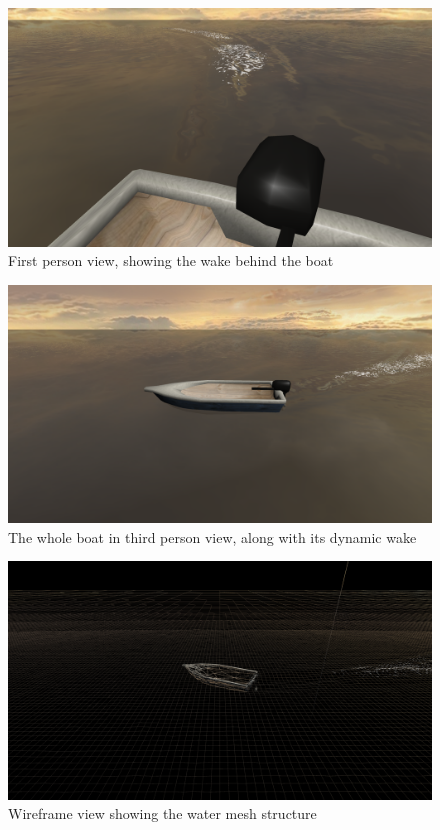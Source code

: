 \documentclass[a4paper,11pt]{article}
\begin{document}
\begin{figure}[h!]
\centering
\includegraphics[width=\textwidth]{screen4.png}
\caption{First person view, showing the wake behind the boat}
\end{figure}

\begin{figure}[h!]
\centering
\includegraphics[width=\textwidth]{screen2.png}
\caption{The whole boat in third person view, along with its dynamic wake}
\end{figure}

\begin{figure}[h!]
\centering
\includegraphics[width=\textwidth]{screen3.png}
\caption{Wireframe view showing the water mesh structure}
\end{figure}
\end{document}
